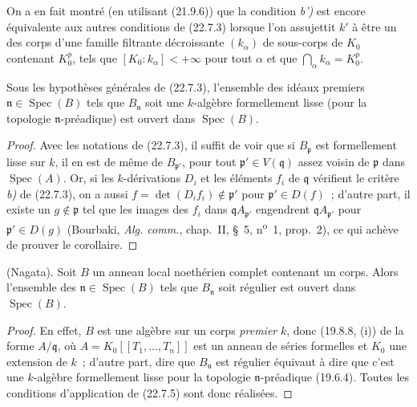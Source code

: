 
\begin{remark}[22.7.4]
\label{0.22.7.4-fr}
On a en fait montré (en utilisant (21.9.6)) que la condition \emph{b')} est encore
équivalente aux autres conditions de (22.7.3) lorsque l'on assujettit $k'$ à
être un des corps d'une famille filtrante décroissante $(k_\alpha)$ de
sous-corps de $K_0$ contenant $K_0^p$, tels que
$[K_0:k_\alpha]<+\infty$ pour tout $\alpha$ et que
$\bigcap_\alpha k_\alpha=K_0^p$.
\end{remark}

\begin{corollary}[22.7.5]
\label{0.22.7.5-fr}
Sous les hypothèses générales de \textup{(22.7.3)}, l'ensemble des idéaux premiers
$\mathfrak n\in\operatorname{Spec}(B)$ tels que $B_{\mathfrak n}$ soit une
$k$-algèbre formellement lisse (pour la topologie $\mathfrak n$-préadique)
est ouvert dans $\operatorname{Spec}(B)$.
\end{corollary}

\begin{proof}
Avec les notations de (22.7.3), il suffit de voir que si $B_{\mathfrak p}$
est formellement lisse sur $k$, il en est de même de $B_{\mathfrak p'}$, pour
tout $\mathfrak p'\in V(\mathfrak q)$ assez voisin de $\mathfrak p$ dans
$\operatorname{Spec}(A)$. Or, si les $k$-dérivations $D_i$ et les éléments
$f_i$ de $\mathfrak q$ vérifient le critère \emph{b)} de (22.7.3), on a aussi
$f=\det(D_if_i)\notin\mathfrak p'$ pour $\mathfrak p'\in D(f)$~; d'autre
part, il existe un $g\notin\mathfrak p$ tel que les images des $f_i$ dans
$\mathfrak qA_{\mathfrak p'}$ engendrent $\mathfrak qA_{\mathfrak p'}$ pour
$\mathfrak p'\in D(g)$ (Bourbaki, \emph{Alg. comm.}, chap.~II, §~5,
n\textsuperscript{o}~1, prop.~2), ce qui achève de prouver le corollaire.
\end{proof}

\begin{corollary}[22.7.6]
\label{0.22.7.6-fr}
\textnormal{(Nagata).} Soit $B$ un anneau local noethérien complet contenant
un corps. Alors l'ensemble des $\mathfrak n\in\operatorname{Spec}(B)$ tels
que $B_{\mathfrak n}$ soit régulier est ouvert dans $\operatorname{Spec}(B)$.
\end{corollary}

\begin{proof}
En effet, $B$ est une algèbre sur un corps \emph{premier} $k$, donc (19.8.8, (i))
de la forme $A/\mathfrak q$, où
$A=K_0[[T_1,\ldots,T_n]]$ est un anneau de séries formelles et $K_0$ une
extension de $k$~; d'autre part, dire que $B_{\mathfrak n}$ est régulier
équivaut à dire que c'est une $k$-algèbre formellement lisse pour la topologie
$\mathfrak n$-préadique (19.6.4). Toutes les conditions d'application de
(22.7.5) sont donc réalisées.
\end{proof}

